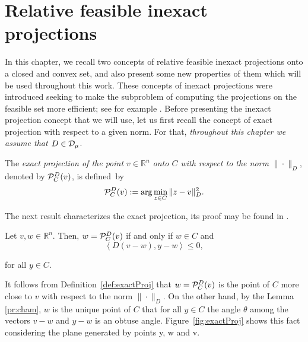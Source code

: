 \chapter{Relative feasible inexact projections} \label{chap:SubInexProj}
\thispagestyle{empty}



In this chapter, we recall two concepts  of relative feasible inexact projections onto a closed and convex set, and  also  present  some  new properties of them which will be used throughout this work. These  concepts  of inexact projections were    introduced seeking to make the subproblem of computing the projections on the feasible  set more efficient;  see for example \cite{BirginMartinezRaydan2003,SalzoVilla2012,VillaSalzo2013}. Before presenting the  inexact projection concept that we will use, let us first recall the concept of exact projection with respect to a given  norm.  For that, {\it throughout this chapter we assume that $D\in {\cal D}_{\mu}$}.

\begin{definition} \label{def:exactProj}
	The {\it exact  projection of the point $v\in \mathbb{R}^{n}$ onto $C$ with respect to the norm $\| \cdot \| _{D}$}, denoted by  ${\cal P}_{C}^{D}(v)$, is  defined~by
	\begin{equation}\label{eq:exactM}
		{\cal P}_{C}^{D}(v):=\arg \min _{z\in C}\|z-v\|^2_{D}.
	\end{equation}
\end{definition}

The next result  characterizes  the exact projection, its  proof may be found in  \cite[Theorem 3.14]{BauschkeLivro2014}.

\begin{lemma} \label{pr:cham}
	Let $v, w \in {\mathbb R}^n$.  Then,  $w={\cal P}_{C}^{D}(v)$ if and only if  $w\in C$ and
	\begin{equation}\label{eq:exactA}
		\left\langle D(v-w), y-w\right\rangle \leq  0,
	\end{equation}

	for all $y \in C.$
\end{lemma}
\begin{remark}\normalfont
	It follows from Definition~\ref{def:exactProj} that $w={\cal P}_{C}^{D}(v)$ is the point of $C$ more close to $v$ with respect to the norm $\| \cdot \| _{D}$. On the other hand, by the Lemma \ref{pr:cham}, $w$ is the unique point of $C$ that for all $y\in C$ the angle $\theta$ among the vectors $v-w$ and $y-w$ is an obtuse angle. Figure~\ref{fig:exactProj} shows this fact considering the plane generated by points y, w and v.
\end{remark}\normalfont

